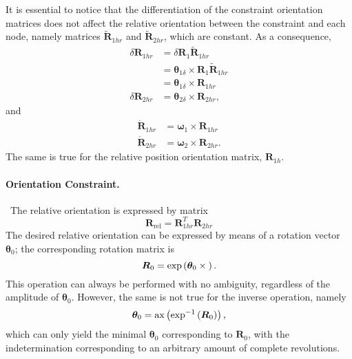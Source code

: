 \documentclass[10pt,fleqn,subeqn]{report}
\newcommand{\T}[1]{\bm{#1}}
\begin{document}
It is essential to notice that the differentiation of the constraint
orientation matrices does not affect the relative orientation between
the constraint and each node, namely matrices $\tilde{\T{R}}_{1hr}$
and $\tilde{\T{R}}_{2hr}$, which are constant.
As a consequence,
\begin{subequations}
\begin{align}
	\delta\T{R}_{1hr}
		&= \delta\T{R}_1 \tilde{\T{R}}_{1hr} \nonumber \\
		&= \T{\theta}_{1\delta} \times \T{R}_1 \tilde{\T{R}}_{1hr} \nonumber \\
		&= \T{\theta}_{1\delta}\times \T{R}_{1hr} \\
	\delta\T{R}_{2hr} &= \T{\theta}_{2\delta}\times \T{R}_{2hr} ,
\end{align}
\end{subequations}
and
\begin{align}
	\dot{\T{R}}_{1hr} &= \T{\omega}_1 \times \T{R}_{1hr} \\
	\dot{\T{R}}_{2hr} &= \T{\omega}_2 \times \T{R}_{2hr} .
\end{align}
The same is true for the relative position orientation matrix,
$\T{R}_{1h}$.


\paragraph{Orientation Constraint.} \
The relative orientation is expressed by matrix
\begin{equation}
	\T{R}_{\mathrm{rel}} = \T{R}_{1hr}^T \T{R}_{2hr}
\end{equation}
The desired relative orientation can be expressed by means
of a rotation vector $\T{\theta}_0$;
the corresponding rotation matrix is
\begin{equation}
	\T{R}_0 = \exp\plbr{\T{\theta}_0\times{}} .
\end{equation}
This operation can always be performed with no ambiguity,
regardless of the amplitude of $\T{\theta}_0$.
However, the same is not true for the inverse operation, namely
\begin{equation}
	\T{\theta}_0 = \mathrm{ax}\plbr{\exp^{-1}\plbr{\T{R}_0}} ,
\end{equation}
which can only yield the minimal $\T{\theta}_0$ corresponding
to $\T{R}_0$,
with the indetermination corresponding to an arbitrary amount 
of complete revolutions.
\end{document}
